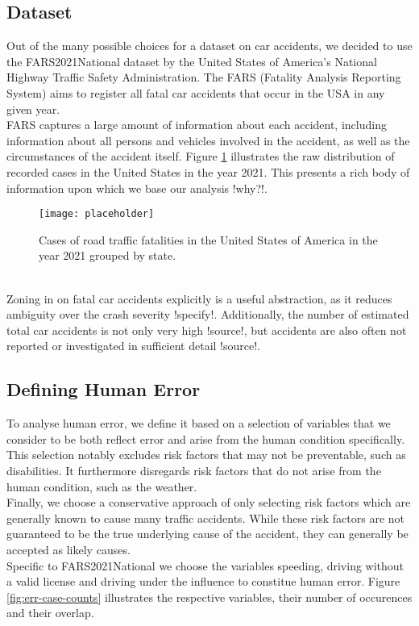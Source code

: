 \documentclass{article}
\theoremstyle{plain}
\theoremstyle{definition}
\theoremstyle{remark}
\begin{document}
\subsection{Dataset}
Out of the many possible choices for a dataset on car accidents, we decided to use the FARS2021National dataset by the United States of America's National Highway Traffic Safety Administration. The FARS (Fatality Analysis Reporting System) aims to register all fatal car accidents that occur in the USA in any given year.
\\
FARS captures a large amount of information about each accident, including information about all persons and vehicles involved in the accident, as well as the circumstances of the accident itself. Figure \ref{fig:fars-cases} illustrates the raw distribution of recorded cases in the United States in the year 2021. This presents a rich body of information upon which we base our analysis !why?!.
\begin{figure}[ht]
	\vskip 0.2in
	\begin{center}
		\centerline{\texttt{[image: placeholder]}}
		\caption{Cases of road traffic fatalities in the United States of America in the year 2021 grouped by state.}
		\label{fig:fars-cases}
	\end{center}
	\vskip -0.2in
\end{figure}
\\
Zoning in on fatal car accidents explicitly is a useful abstraction, as it reduces ambiguity over the crash severity !specify!. Additionally, the number of estimated total car accidents is not only very high !source!, but accidents are also often not reported or investigated in sufficient detail !source!.



\subsection{Defining Human Error}
To analyse human error, we define it based on a selection of variables that we consider to be both reflect error and arise from the human condition specifically. This selection notably excludes risk factors that may not be preventable, such as disabilities. It furthermore disregards risk factors that do not arise from the human condition, such as the weather.\\
Finally, we choose a conservative approach of only selecting risk factors which are generally known to cause many traffic accidents. While these risk factors are not guaranteed to be the true underlying cause of the accident, they can generally be accepted as likely causes.
\\
Specific to FARS2021National we choose the variables speeding, driving without a valid license and driving under the influence to constitue human error. Figure \ref{fig:err-case-counts} illustrates the respective variables, their number of occurences and their overlap.
\end{document}
